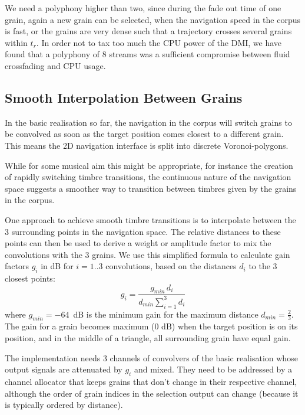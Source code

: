 We need a polyphony higher than two, since during the fade out time of one grain, again a new grain can be selected, when the navigation speed in the corpus is fast, or the grains are very dense such that a trajectory crosses several grains within $t_r$. In order not to tax too much the CPU power of the DMI, we have found that a polyphony of 8 streams was a sufficient compromise between fluid crossfading and CPU usage.

\subsection{Smooth Interpolation Between Grains}\label{sec:mix}

In the basic realisation so far, the navigation in the corpus will switch grains to be convolved as soon as the target position comes closest to a different grain.  
This means the 2D navigation interface is split into discrete Voronoi-polygons.

While for some musical aim this might be appropriate, for instance the creation of rapidly switching timbre transitions, the continuous nature of the navigation space suggests a smoother way to transition between timbres given by the grains in the corpus.

One approach to achieve smooth timbre transitions is to interpolate between the 3 surrounding points in the navigation space.  The relative distances to these points can then be used to derive a weight or amplitude factor \cite{FreedMacCallumSchmederWessel-nime2010-hybridization-interfaces} to mix the convolutions with the 3 grains.  We use this simplified formula to calculate gain factors $g_i$ in dB for $i = 1..3$ convolutions, based on the distances $d_i$ to the 3 closest points:
%
\begin{equation}
  g_i = \frac{g_{min} \, d_i}{d_{min} \sum_{i=1}^3 d_i}
\end{equation}
%
where $g_{min} = -64$~dB is the minimum gain for the maximum distance $d_{min} = \frac{2}{3}$.
The gain for a grain becomes maximum (0 dB) when the target position is on its position, and in the middle of a triangle, all surrounding grain have equal gain.

The implementation needs 3 channels of convolvers of the basic realisation whose output signals are attenuated by $g_i$ and mixed.  They need to be addressed by a channel allocator that keeps grains that don't change in their respective channel, although the order of grain indices in the selection output can change (because it is typically ordered by distance).

